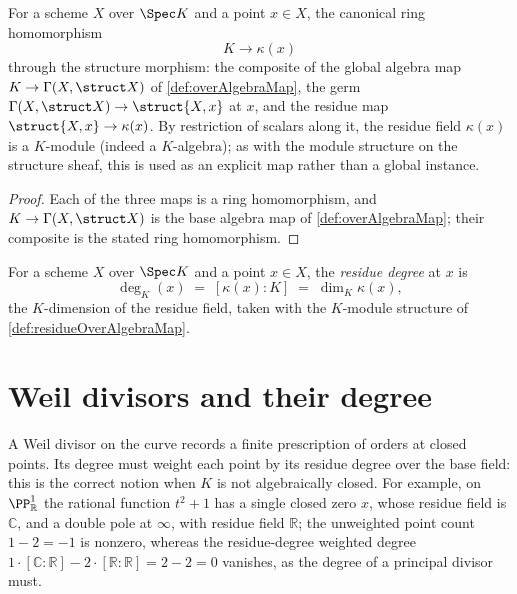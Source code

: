 \begin{definition}
  \label{def:residueOverAlgebraMap}
  \leanok
  For a scheme \(X\) over \(\Spec K\) and a point \(x \in X\), the canonical ring homomorphism
  \[
    K \longrightarrow \kappa(x)
  \]
  through the structure morphism: the composite of the global algebra map
  \(K \to \Gamma(X, \struct X)\) of \ref{def:overAlgebraMap}, the germ
  \(\Gamma(X, \struct X) \to \struct{X,x}\) at \(x\), and the residue map
  \(\struct{X,x} \to \kappa(x)\). By restriction of scalars along it, the residue field
  \(\kappa(x)\) is a \(K\)-module (indeed a \(K\)-algebra); as with the module structure on the
  structure sheaf, this is used as an explicit map rather than a global instance.
\end{definition}
\begin{proof}
  \leanok
  Each of the three maps is a ring homomorphism, and \(K \to \Gamma(X, \struct X)\) is the base
  algebra map of \ref{def:overAlgebraMap}; their composite is the stated ring homomorphism.
\end{proof}

\begin{definition}
  \label{def:residueDeg}
  \leanok
  For a scheme \(X\) over \(\Spec K\) and a point \(x \in X\), the \emph{residue degree} at
  \(x\) is
  \[
    \deg_K(x) \;=\; [\kappa(x) : K] \;=\; \dim_K \kappa(x),
  \]
  the \(K\)-dimension of the residue field, taken with the \(K\)-module structure of
  \ref{def:residueOverAlgebraMap}.
\end{definition}

\section{Weil divisors and their degree}

A Weil divisor on the curve records a finite prescription of orders at closed points. Its degree
must weight each point by its residue degree over the base field: this is the correct notion when
\(K\) is not algebraically closed. For example, on \(\PP^1_{\mathbb{R}}\) the rational function
\(t^2 + 1\) has a single closed zero \(x\), whose residue field is \(\mathbb{C}\), and a double
pole at \(\infty\), with residue field \(\mathbb{R}\); the unweighted point count \(1 - 2 = -1\)
is nonzero, whereas the residue-degree weighted degree
\(1 \cdot [\mathbb{C} : \mathbb{R}] - 2 \cdot [\mathbb{R} : \mathbb{R}] = 2 - 2 = 0\)
vanishes, as the degree of a principal divisor must.

